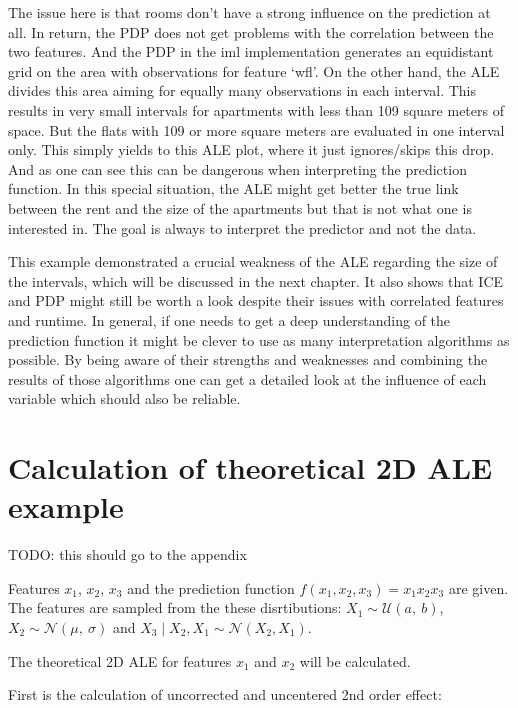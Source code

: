 \documentclass[
]{krantz}
\begin{document}
The issue here is that rooms don't have a strong influence on the prediction at all. In return, the PDP does not get problems with the correlation between the two features. And the PDP in the iml implementation generates an equidistant grid on the area with observations for feature `wfl'. On the other hand, the ALE divides this area aiming for equally many observations in each interval. This results in very small intervals for apartments with less than 109 square meters of space. But the flats with 109 or more square meters are evaluated in one interval only. This simply yields to this ALE plot, where it just ignores/skips this drop. And as one can see this can be dangerous when interpreting the prediction function. In this special situation, the ALE might get better the true link between the rent and the size of the apartments but that is not what one is interested in. The goal is always to interpret the predictor and not the data.

This example demonstrated a crucial weakness of the ALE regarding the size of the intervals, which will be discussed in the next chapter. It also shows that ICE and PDP might still be worth a look despite their issues with correlated features and runtime. In general, if one needs to get a deep understanding of the prediction function it might be clever to use as many interpretation algorithms as possible. By being aware of their strengths and weaknesses and combining the results of those algorithms one can get a detailed look at the influence of each variable which should also be reliable.

\hypertarget{ale-2d-example-calculation}{%
\section{Calculation of theoretical 2D ALE example}\label{ale-2d-example-calculation}}

TODO: this should go to the appendix

Features \(x_1\), \(x_2\), \(x_3\) and the prediction function \(\hat{f}(x_1, x_2, x_3) = x_1 x_2 x_3\) are given.
The features are sampled from the these disrtibutions:
\(X_1 \sim \mathcal{U}(a,~b)\), \(X_2 \sim \mathcal{N}(\mu,~\sigma)\) and \(X_3\mid X_2, X_1 \sim \mathcal{N}(X_2,X_1)\).

The theoretical 2D ALE for features \(x_1\) and \(x_2\) will be calculated.

First is the calculation of uncorrected and uncentered 2nd order effect:
\end{document}

